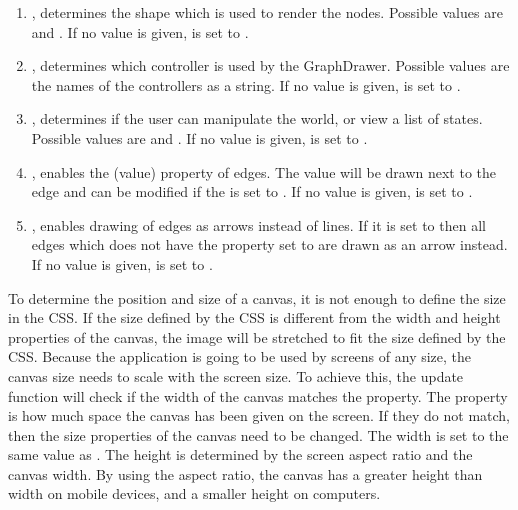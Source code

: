 \begin{enumerate}
    \item {}, determines the shape which is used to render the nodes. Possible values are  and . If no value is given,  is set to .
    \item {}, determines which controller is used by the GraphDrawer. Possible values are the names of the controllers as a string. If no value is given,  is set to .
    \item  {}, determines if the user can manipulate the world, or view a list of states. Possible values are  and . If no value is given,  is set to .
    \item {}, enables the  (value) property of edges. The value will be drawn next to the edge and can be modified if the  is set to . If no value is given,  is set to .
    \item {}, enables drawing of edges as arrows instead of lines. If it is set to  then all edges which does not have the  property set to  are drawn as an arrow instead. If no value is given,  is set to .
\end{enumerate}
To determine the position and size of a canvas, it is not enough to define the size in the CSS. If the size defined by the CSS is different from the width and height properties of the canvas, the image will be stretched to fit the size defined by the CSS. Because the application is going to be used by screens of any size, the canvas size needs to scale with the screen size. To achieve this, the update function will check if the width of the canvas matches the  property. The  property is how much space the canvas has been given on the screen. If they do not match, then the size properties of the canvas need to be changed. The width is set to the same value as . The height is determined by the screen aspect ratio and the canvas width. By using the aspect ratio, the canvas has a greater height than width on mobile devices, and a smaller height on computers.
\\[11pt]

